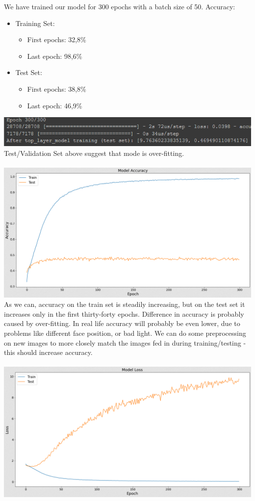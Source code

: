 We have trained our model for 300 epochs with a batch size of 50.
Accuracy:
\begin{itemize}
      \item Training Set:
        \begin{itemize}
            \item First epochs: 32,8\%
            \item Last epoch: 98,6\%
        \end{itemize}
      \item Test Set:
        \begin{itemize}
            \item First epochs: 38,8\%
            \item Last epoch: 46,9\%
        \end{itemize}
\end{itemize}
\includegraphics[scale=0.9]{images/modelOne/evaluationOne.png}
Test/Validation Set above suggest that mode is over-fitting.\\
\\
\includegraphics[scale=0.5]{images/modelOne/accOne.png}
As we can, accuracy on the train set is steadily increasing, but on the test set it increases only in the first thirty-forty epochs. Difference in accuracy is probably caused by over-fitting. In real life accuracy will probably be even lower, due to problems like different face position, or bad light. We can do some preprocessing on new images to more closely match the images fed in during training/testing - this should increase accuracy.\\
\\
\includegraphics[scale=0.5]{images/modelOne/lossOne.png}
